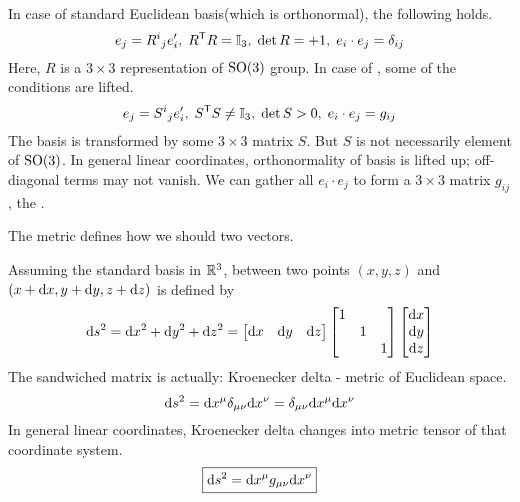 \documentclass[a4paper, 10pt]{article}
\begin{document}

\begin{example}
    In case of standard Euclidean basis(which is orthonormal), the following holds.
    \[ e_{j} = R^{i}{}_{j}e_{i}', \; R^{\mathsf{T}}R = \mathbb{I}_{3}, \; \det R = +1, \; e_{i} \cdot e_{j} = \delta_{ij} \]
    Here, $R$ is a $3 \times 3$ representation of $\mathrm{SO(3)}$ group. In case of , some of the conditions are lifted.
    \[ e_{j} = S^{i}{}_{j}e_{i}', \; S^{\mathsf{T}}S \neq \mathbb{I}_{3}, \; \det S > 0, \; e_{i} \cdot e_{j} = g_{ij} \]
    The basis is transformed by some $3 \times 3$ matrix $S$. But $S$ is not necessarily element of $\mathrm{SO}(3)$. In general linear coordinates, orthonormality of basis is lifted up; off-diagonal terms may not vanish. We can gather all $e_{i} \cdot e_{j}$ to form a $3 \times 3$ matrix $g_{ij}$, the .
\end{example}

\seprule

The metric defines how we should  two vectors.
\begin{example}
    Assuming the standard basis in $\mathbb{R}^{3}$,  between two points $(x,y,z)$ and $(x+\mathrm{d} x,y+\mathrm{d} y,z+\mathrm{d} z)$ is defined by
    \[ \mathrm{d} s^{2} = \mathrm{d} x^{2} + \mathrm{d} y^{2} + \mathrm{d} z^{2} = \begin{bmatrix}\mathrm{d} x & \mathrm{d} y & \mathrm{d} z\end{bmatrix}\begin{bmatrix}1 & & \\ & 1 & \\ & & 1\end{bmatrix}\begin{bmatrix}\mathrm{d} x \\ \mathrm{d} y \\ \mathrm{d} z\end{bmatrix} \]
    The sandwiched matrix is actually: Kroenecker delta - metric of Euclidean space.
    \[ \mathrm{d} s^{2} = \mathrm{d} x^{\mu}\delta_{\mu\nu}\mathrm{d} x^{\nu} = \delta_{\mu\nu}\mathrm{d} x^{\mu}\mathrm{d} x^{\nu} \]
    In general linear coordinates, Kroenecker delta changes into metric tensor of that coordinate system.
    \[ \boxed{\mathrm{d} s^{2} = \mathrm{d} x^{\mu} g_{\mu \nu} \mathrm{d} x^{\nu}} \]
\end{example}
\end{document}
